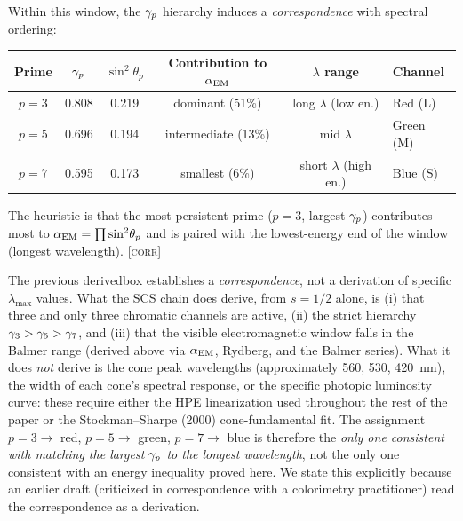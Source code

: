 \documentclass[12pt,a4paper]{article}
\begin{document}
\begin{derivedbox}
Within this window, the $\gamma_{p}$ hierarchy induces a
\emph{correspondence} with spectral ordering:
\begin{center}
\begin{tabular}{cccccl}
\toprule
Prime & $\gamma_{p}$ & $\sin^2\!\theta_p$ & Contribution to $\alpha_{\mathrm{EM}}$ & $\lambda$ range & Channel \\
\midrule
$p = 3$ & 0.808 & 0.219 & dominant (51\%) & long $\lambda$ (low en.) & Red (L) \\
$p = 5$ & 0.696 & 0.194 & intermediate (13\%) & mid $\lambda$ & Green (M) \\
$p = 7$ & 0.595 & 0.173 & smallest (6\%) & short $\lambda$ (high en.) & Blue (S) \\
\bottomrule
\end{tabular}
\end{center}

The heuristic is that the most persistent prime ($p = 3$, largest
$\gamma_{p}$) contributes most to $\alpha_{\mathrm{EM}} = \prod \sin^2\!\theta_p$
and is paired with the lowest-energy end of the window (longest
wavelength). \textsc{[corr]}
\end{derivedbox}

\begin{remark}
The previous derivedbox establishes a \emph{correspondence}, not a
derivation of specific $\lambda_{\max}$ values. What the SCS chain
does derive, from $s = 1/2$ alone, is (i) that three and only three
chromatic channels are active, (ii) the strict hierarchy
$\gamma_{3} > \gamma_{5} > \gamma_{7}$, and (iii) that the visible
electromagnetic window falls in the Balmer range (derived above via
$\alpha_{\mathrm{EM}}$, Rydberg, and the Balmer series). What it does \emph{not}
derive is the cone peak wavelengths (approximately 560, 530, 420~nm),
the width of each cone's spectral response, or the specific photopic
luminosity curve: these require either the HPE linearization used
throughout the rest of the paper or the Stockman--Sharpe (2000)
cone-fundamental fit. The assignment $p=3 \to$ red, $p=5 \to$ green,
$p=7 \to$ blue is therefore the \emph{only one consistent with
matching the largest $\gamma_{p}$ to the longest wavelength}, not the
only one consistent with an energy inequality proved here. We state
this explicitly because an earlier draft (criticized in correspondence
with a colorimetry practitioner) read the correspondence as a
derivation.
\end{remark}
\end{document}
